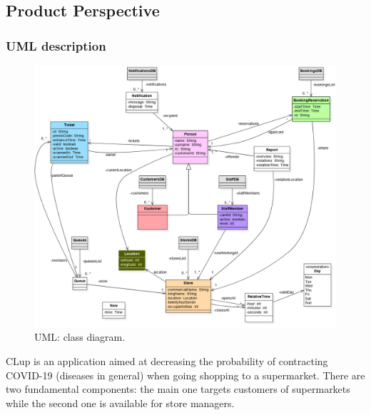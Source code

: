 \sffamily

\subsection{Product Perspective}

\subsubsection{UML description}
\begin{figure} [H]
	\includegraphics[width=\linewidth]{../Diagrams/main_class_diagram.png}
	\caption{UML: class diagram.}
	\label{fig:UML}
\end{figure}
CLup is an application aimed at decreasing the probability of contracting COVID-19 (diseases in general) when going shopping to a supermarket. There are two fundamental components: the main one targets customers of supermarkets while the second one is available for store managers.\newline
